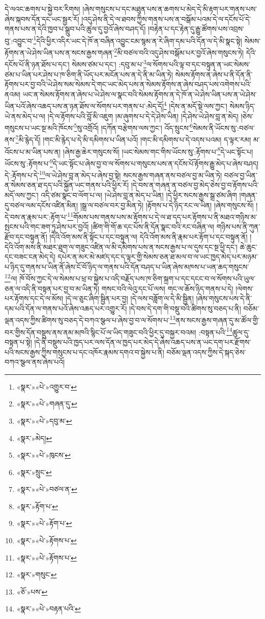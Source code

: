 དེ་ལའང་ཆགས་པ་སྐྱེ་བར་རིགས། །ཞེས་གསུངས་པ་དང་མཐུན་པས་ན་ཆགས་པ་མེད་དེ་མི་རྟག་པར་གནས་པས་ཞེས་སྐབས་དོན་དང་ཡང་སྦྱར་རོ། །འདུ་ཤེས་ནི་དེ་ལ་ཐབས་ཀྱིས་གནས་པས་ན་བསྒོམ་པའམ་དེ་ལ་དངོས་པོ་དེ་གནས་པས་ན་དེའི་ཁྱབ་པ་སྒྲུབ་པའི་ཚུལ་དུ་བྱའོ་ཞེས་བཤད་དོ། །བརྟེན་པ་དང་རྟེན་དུ་རྒྱུ་ཚོགས་པས་འབྲས་བུ་:འབྱུང་བ་\footnote{«སྣར་»«པེ་»འགྱུར་བ་}དེའི་ཕྱིར་འདིར་ཡང་དེ་ཁོ་ན་བཞིན་འབྱུང་ངམ་སྙམ་ན་རེ་ཞིག་དམ་པའི་དོན་ལ་དེ་མི་སྣང་སྟེ། སེམས་རྟོགས་ན་ཡེ་ཤེས་ཡིན་པས་ན་སངས་རྒྱས་གཞན་\footnote{«སྣར་»«པེ་»གཞན་དུ་}མི་བཙལ་བའི་འདུ་ཤེས་བསྒོམ་པར་བྱའོ་ཞེས་གསུངས་ཏེ། དེའི་དངོས་པོ་ནི་ཉན་ཐོས་པ་དང་། སེམས་ཙམ་པ་དང་། :དབུ་མ་པ་\footnote{«སྣར་»«པེ་»དབུ་མ་}ལ་སོགས་པའི་ལྟ་བ་དང་བསྟུན་ན་ཡང་སེམས་ཙམ་པ་ཡིན་པར་ཤེས་པ་ཁ་ཅིག་ནི་ཡོད་པར་མངོན་པས་ན་དེ་ནི་མ་ཡིན་ཏེ། སེམས་རྟོགས་ན་ཞེས་པ་ནི་དོན་ནི་རྟོགས་པར་བྱ་བའི་ཡེ་ཤེས་སམ་སེམས་དེ་གང་ཡང་མེད་པས་ན་སེམས་རྟོགས་ན་ཞེས་བཤད་པས་འགེགས་པའི་ནའམ། ཡང་ན་སེམས་རྟོགས་ན་ཞེས་པ་ཡེ་ཤེས་ལ་སྣང་བའི་སེམས་རྟོགས་ན་དེ་ཁོ་ན་ཡེ་ཤེས་ཡིན་པས་ན་ཡེ་ཤེས་ཡིན་པའོ་ཞེས་འཆད་པས་ན་ཉན་ཐོས་ལ་སོགས་པར་གནས་པ་:མེད་དོ།\footnote{«སྣར་»མེད།} །དེས་ན་མདོ་སྡེ་ལས་ཀྱང་། སེམས་ཉིད་ཡེ་ནས་མེད་པ་ལ། །དེ་ལ་རྟོགས་པའི་བློ་མི་འཇུག །མ་ཞུགས་པ་དེ་དེ་ཤེས་ཡིན། །དེ་ཤེས་ཡེ་ཤེས་བླ་ན་མེད། །ཅེས་གསུངས་པ་ཡང་སྔ་མའི་ཁོངས་\footnote{«སྣར་»«པེ་»ཁུངས་}སུ་འགྲོའོ། །དཀོན་བརྩེགས་ལས་ཀྱང་། འོད་སྲུངས་\footnote{«སྣར་»སྲུང་}སེམས་ནི་ཡོངས་སུ་:བཙལ་ནས་\footnote{«སྣར་»«པེ་»བཙལ་ན་}མི་རྙེད་དོ། །གང་མི་རྙེད་པ་དེ་མི་དམིགས་པ་ཡིན་པའོ། །གང་མི་དམིགས་པ་དེ་འདས་པའམ། ད་ལྟར་རམ། མ་འོངས་པ་མ་ཡིན་པས་ན། །ཞེས་རྒྱ་ཆེར་གསུངས་སོ། །ཡང་སེམས་གང་གིས་ཡོངས་སུ་:རྟོགས་པ་\footnote{«སྣར་»རྟོག་པ་}དེ་ཡང་སྟོང་པ། ཡོངས་སུ་:རྟོགས་པ་\footnote{«སྣར་»«པེ་»རྟོག་པ་}དེ་ཡང་སྟོང་པ་ཞེས་བྱ་བ་ལ་སོགས་པ་གསུངས་པས་ན་དངོས་པོ་རྟོགས་རྒྱུ་མེད་པ་ཞེས་བཤད། དེ་:རྟོགས་པ་དེ་\footnote{«སྣར་»«པེ་»རྟོགས་པ་}ལ་ཡེ་ཤེས་བླ་ན་མེད་པ་ཞེས་བྱ་སྟེ། སངས་རྒྱས་གཞན་ནས་བཙལ་བྱ་མ་ཡིན་ཏེ། བཙལ་བྱ་ཡིན་ན་སེམས་ཅན་ཐ་དད་པའི་སྐྱོན་ཡང་གནས་པའི་ཕྱིར་རོ། །དེ་བས་ན་གཞན་ན་བཙལ་བྱ་མེད་ཅེས་བྱ་བ་རྟོགས་པའི་མདོ་ལས་ཀྱང་། འདི་ཙམ་སྣང་བ་ལོག་པ་ལ། །ཡེ་ཤེས་བླ་ན་མེད་པ་ཡིན། །དེ་ཕྱིར་སངས་རྒྱས་སྒྲ་ཙམ་ཞིག །གཞན་དུ་བཙལ་ལམ་དངོས་འཛིན་མིན། །སྒྲ་ལ་བཙལ་བར་བྱ་མིན་ཏེ། །རྟོགས་པ་དེ་ཉིད་རང་ལ་ཡིན། །ཞེས་གསུངས་སོ། །དེ་བས་ན་རྣམ་པར་:རྟོག་པ་\footnote{«སྣར་»«པེ་»རྟོགས་པ་}གོམས་པས་གནས་པས་མ་རྟོགས་པ་དེ་ལ་ཐ་དད་པར་རྟོགས་པ་ནི་མཐའ་གཉིས་མ་སྤངས་པའི་གང་ཟག་ཏུ་ཤེས་པར་བྱའོ། །ཚིག་གི་གོ་ཆ་དང་པོས་ནི་དོན་སྣང་བའི་རང་བཞིན་ལ། གཉིས་པས་ནི་ཀུན་རྫོབ་དང་བསྟུན་ནོ། །དེའི་འོག་མས་ནི་སྟོང་པ་དང་བསྟུན་ལ། དེའི་འོག་མས་ནི་རྣམ་པར་རྟོག་པ་དང་བསྟུན་ནོ། །དེའི་འོག་མས་ནི་མཐར་ཐུག་ལ་གཟུང་འཛིན་ལ་མི་དམིགས་པས་ན་སངས་རྒྱས་པ་ལ་དུས་དང་སྔ་ཕྱི་དང་། ཆེ་ཆུང་དང་བཟང་ངན་མེད་དེ། དཔེར་ན་མར་མེ་མཛད་དང་ད་ལྟར་གྱི་སེམས་ཅན་ཐ་མལ་བ་ལ་ཡང་ཁྱད་མེད་པར་མཉམ་པ་ཉིད་དུ་གནས་པ་ཡིན་ནོ་ཞེས་ངོ་བོ་ཉིད་ལ་གནས་པའི་དོན་བཤད་པ་ཡིན་ཞེས་མཁས་པ་ཡན་ཆད་གསུངས་\footnote{«སྣར་»གསུང་}ལ། ཁོ་བོས་ཀྱང་དེ་ལ་སེམས་པ་ཕྲ་བ་སྐྱེས་པ་འདི་བརྗོད་པས་ཁ་ཅིག་སྐྲག་པ་དང་དངང་བ་ལ་སོགས་པའི་ཡུལ་ཅན་ལ་འདི་ནི་བསྟན་པར་བྱ་བ་མ་ཡིན་ཏེ། གསང་བའི་ལེའུ་དང་པོ་ལས། གང་ལ་ཆོས་ཉིད་གནས་པ་དེ། །ལེགས་པར་རྟོགས་དང་དེ་ལ་མོས། །དེ་ལ་ཅུང་ཞིག་སྦྱིན་པར་བྱ། །དེ་ལས་བཟློག་ལ་དེ་མི་སྦྱིན། །ཞེས་གསུངས་པས་དེ་ནི་དམ་པའི་དོན་ལ་གནས་པའོ་ཞེས་འཆད་པར་འགྱུར་རོ། །དེ་བས་དེ་དག་གི་བསྡུ་བའི་ཚིགས་སུ་བཅད་པ་ནི། བཅོམ་ལྡན་འདས་ཀྱིས་ཚིགས་སུ་བཅད་དེ་བཀའ་སྩལ་པ་ཞེས་བྱ་བ་ལ་སོགས་པ་\footnote{«ཅོ་»པས་}ནས་སངས་རྒྱས་གཞན་དུ་མ་ཚོལ་གྱི་བར་གྱིས་དོན་བསྡུས་ནས་ནམ་མཁའི་སྙིང་པོ་ལ་ཡིད་གཟུང་བའི་ཕྱིར་དུ་བསྐྱར་བའམ། :བསྟན་པའི་\footnote{«སྣར་»«པེ་»བརྟན་པའི་}ཚུལ་དུ་བསྟན་པ་སྟེ། །དེ་ནི་བསྡུས་པའི་ཁྱད་པར་ལས་དོན་ལ་ཁྱད་པར་མེད་དེ་ཞེས་འཆད་པས་ན་ཡང་དག་པར་རྫོགས་པའི་སངས་རྒྱས་ཀྱིས་གསུངས་པ་དང་འཁོར་རྣམས་དགའ་བ་སྐྱེས་པ་ནི། བཅོམ་ལྡན་འདས་ཀྱིས་དེ་སྐད་ཅེས་བཀའ་སྩལ་ནས་ཞེས་པའོ། 